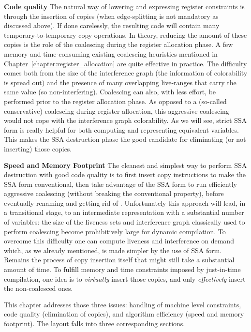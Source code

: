 {\bf Code quality}
The natural way of lowering \phifuns and expressing register constraints is through the insertion of copies (when edge-splitting is not mandatory as discussed above). If done carelessly, the resulting code will contain many temporary-to-temporary copy operations. In theory, reducing the amount of these copies is the role of the coalescing during the register allocation phase.
A few memory and time-consuming existing coalescing heuristics mentioned in Chapter~\ref{chapter:register_allocation} are quite effective in practice. The difficulty comes both from the size of the interference graph (the information of colorability is spread out) and the presence of many overlapping live-ranges that carry the same value (so non-interfering).
Coalescing can also, with less effort, be performed prior to the register allocation phase. As opposed to a (so-called conservative) coalescing during register allocation, this aggressive coalescing would not cope with the interference graph colorability. As we will see, strict SSA form is really helpful for both computing and representing equivalent variables. This makes the SSA destruction phase the good candidate for eliminating (or not inserting) those copies.

{\bf Speed and Memory Footprint} 
The cleanest and simplest way to perform SSA destruction with good code quality is to first insert copy instructions to make the SSA form conventional, then take advantage of the SSA form to run efficiently aggressive coalescing (without breaking the conventional property), before eventually renaming \phiwebs\index{\phiweb} and getting rid of \phifuns. Unfortunately this approach will lead, in a transitional stage, to an intermediate representation with a substantial number of variables: the size of the liveness sets and interference graph classically used to perform coalescing become prohibitively large for dynamic compilation. To overcome this difficulty one can compute liveness and interference on demand which, as we already mentioned, is made simpler by the use of SSA form. Remains the process of copy insertion itself that might still take a substantial amount of time. To fulfill memory and time constraints imposed by just-in-time compilation, one idea is to \emph{virtually} insert those copies, and only \emph{effectively} insert the non-coalesced ones.    

This chapter addresses those three issues: handling of machine level constraints, code quality (elimination of copies), and algorithm efficiency (speed and memory footprint). The layout falls into three corresponding sections.
